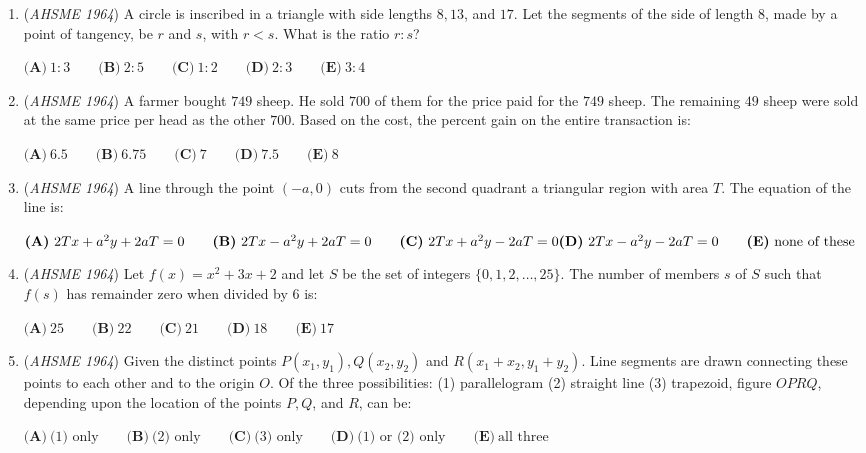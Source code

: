 \begin{enumerate}
	\item (\textit{AHSME 1964}) A circle is inscribed in a triangle with side lengths $8, 13$, and $17$. Let the segments of the side of length $8$, 
made by a point of tangency, be $r$ and $s$, with $r<s$. What is the ratio $r:s$? 


 $\textbf{(A)}\ 1:3 \qquad \textbf{(B)}\ 2:5 \qquad \textbf{(C)}\ 1:2 \qquad \textbf{(D)}\ 2:3 \qquad \textbf{(E)}\ 3:4$


	\item (\textit{AHSME 1964}) A farmer bought $749$ sheep. He sold $700$ of them for the price paid for the $749$ sheep. 
The remaining $49$ sheep were sold at the same price per head as the other $700$. 
Based on the cost, the percent gain on the entire transaction is:


 $\textbf{(A)}\ 6.5 \qquad \textbf{(B)}\ 6.75 \qquad \textbf{(C)}\ 7 \qquad \textbf{(D)}\ 7.5 \qquad \textbf{(E)}\ 8$


	\item (\textit{AHSME 1964}) A line through the point $(-a,0)$ cuts from the second quadrant a triangular region with area $T$. The equation of the line is:


 $\textbf{(A)}\ 2Tx+a^2y+2aT=0 \qquad \textbf{(B)}\ 2Tx-a^2y+2aT=0 \qquad \textbf{(C)}\ 2Tx+a^2y-2aT=0 \qquad \\ \textbf{(D)}\ 2Tx-a^2y-2aT=0 \qquad \textbf{(E)}\ \text{none of these}$


	\item (\textit{AHSME 1964}) Let $f(x)=x^2+3x+2$ and let $S$ be the set of integers $\{0, 1, 2, \dots , 25 \}$. 
The number of members $s$ of $S$ such that $f(s)$ has remainder zero when divided by $6$ is:


 $\textbf{(A)}\ 25\qquad \textbf{(B)}\ 22\qquad \textbf{(C)}\ 21\qquad \textbf{(D)}\ 18 \qquad \textbf{(E)}\ 17$


	\item (\textit{AHSME 1964}) Given the distinct points $P(x_1, y_1), Q(x_2, y_2)$ and $R(x_1+x_2, y_1+y_2)$. 
Line segments are drawn connecting these points to each other and to the origin $O$. 
Of the three possibilities: (1) parallelogram (2) straight line (3) trapezoid, figure $OPRQ$, 
depending upon the location of the points $P, Q$, and $R$, can be:


 $\textbf{(A)}\ \text{(1) only}\qquad \textbf{(B)}\ \text{(2) only}\qquad \textbf{(C)}\ \text{(3) only}\qquad \textbf{(D)}\ \text{(1) or (2) only}\qquad \textbf{(E)}\ \text{all three}$



\end{enumerate}
